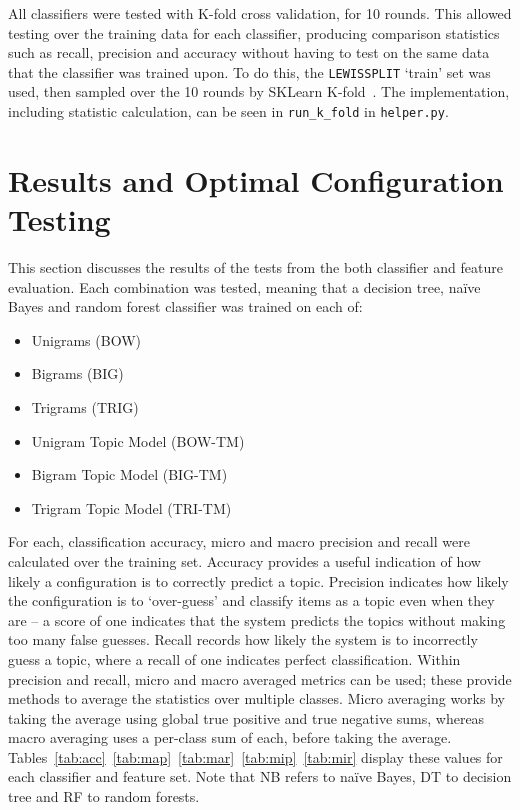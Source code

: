 \documentclass[11pt]{article}
\begin{document}
All classifiers were tested with K-fold cross validation, for 10 rounds. This allowed testing over the training data for each classifier, producing comparison statistics such as recall, precision and accuracy without having to test on the same data that the classifier was trained upon. To do this, the \texttt{LEWISSPLIT} `train' set was used, then sampled over the 10 rounds by SKLearn K-fold~\cite{kf}. The implementation, including statistic calculation, can be seen in \texttt{run\_k\_fold} in \texttt{helper.py}.

\section{Results and Optimal Configuration Testing}
This section discusses the results of the tests from the both classifier and feature evaluation. Each combination was tested, meaning that a decision tree, naïve Bayes and random forest classifier was trained on each of:
\begin{itemize}
\item Unigrams (BOW)
\item Bigrams (BIG)
\item Trigrams (TRIG)
\item Unigram Topic Model (BOW-TM)
\item Bigram Topic Model (BIG-TM)
\item Trigram Topic Model (TRI-TM)
\end{itemize}

For each, classification accuracy, micro and macro precision and recall were calculated over the training set. Accuracy provides a useful indication of how likely a configuration is to correctly predict a topic. Precision indicates how likely the configuration is to `over-guess' and classify items as a topic even when they are – a score of one indicates that the system predicts the topics without making too many false guesses. Recall records how likely the system is to incorrectly guess a topic, where a recall of one indicates perfect classification. Within precision and recall, micro and macro averaged metrics can be used; these provide methods to average the statistics over multiple classes. Micro averaging works by taking the average using global true positive and true negative sums, whereas macro averaging uses a per-class sum of each, before taking the average. Tables~\ref{tab:acc}~\ref{tab:map}~\ref{tab:mar}~\ref{tab:mip}~\ref{tab:mir} display these values for each classifier and feature set. Note that NB refers to na{\"i}ve Bayes, DT to decision tree and RF to random forests.
\end{document}
